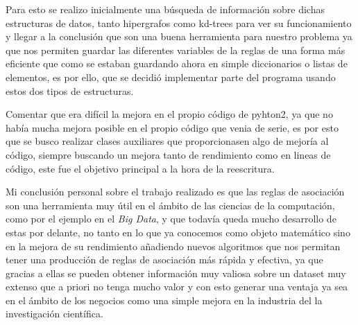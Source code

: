 \documentclass{cosas/tfg_domingo}
\begin{document}
Para esto se realizo inicialmente una búsqueda de información sobre dichas estructuras de datos, tanto hipergrafos como kd-trees para ver su funcionamiento y llegar a la conclusión que son una buena herramienta para nuestro problema ya que nos permiten guardar las diferentes variables de la reglas de una forma más eficiente que como se estaban guardando ahora en simple diccionarios o listas de elementos, es por ello, que se decidió implementar parte del programa usando estos dos tipos de estructuras.

\hfill

Comentar que era difícil la mejora en el propio código de pyhton2, ya que no había mucha mejora posible en el propio código que venia de serie, es por esto que se busco realizar clases auxiliares que proporcionasen algo de mejoría al código, siempre buscando un mejora tanto de rendimiento como en lineas de código, este fue el objetivo principal a la hora de la reescritura.

\hfill

Mi conclusión personal sobre el trabajo realizado es que las reglas de asociación son una herramienta muy útil en el ámbito de las ciencias de la computación, como por el ejemplo en el \textit{Big Data}, y que todavía queda mucho desarrollo de estas por delante, no tanto en lo que ya conocemos como objeto matemático sino en la mejora de su rendimiento añadiendo nuevos algoritmos que nos permitan tener una producción de reglas de asociación más rápida y efectiva, ya que gracias a ellas se pueden obtener información muy valiosa sobre un dataset muy extenso que a priori no tenga mucho valor y con esto generar una ventaja ya sea en el ámbito de los negocios como una simple mejora en la industria del la investigación científica.


\end{document}
